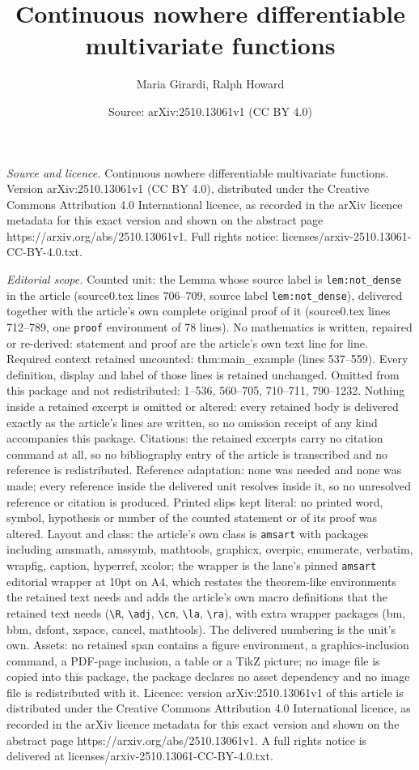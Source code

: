 \documentclass[10pt,a4paper]{amsart}
\title[Continuous nowhere differentiable multivariate functions]{Continuous nowhere differentiable multivariate functions}
\author{Maria Girardi, Ralph Howard}
\date{Source: arXiv:2510.13061v1 (CC BY 4.0)}
\begin{document}
\maketitle

\noindent\emph{Source and licence.} Continuous nowhere differentiable multivariate functions. Version arXiv:2510.13061v1 (CC BY 4.0), distributed under the Creative Commons Attribution 4.0 International licence, as recorded in the arXiv licence metadata for this exact version and shown on the abstract page https://arxiv.org/abs/2510.13061v1. Full rights notice: licenses/arxiv-2510.13061-CC-BY-4.0.txt.\par\smallskip

\noindent\textit{Editorial scope.} Counted unit: the Lemma whose source label is \texttt{lem:not\_dense} in the article (source0.tex lines 706--709, source label \texttt{lem:not\_dense}), delivered together with the article's own complete original proof of it (source0.tex lines 712--789, one \texttt{proof} environment of 78 lines). No mathematics is written, repaired or re-derived: statement and proof are the article's own text line for line. Required context retained uncounted: thm:main\_example (lines 537--559). Every definition, display and label of those lines is retained unchanged. Omitted from this package and not redistributed: 1--536, 560--705, 710--711, 790--1232. Nothing inside a retained excerpt is omitted or altered: every retained body is delivered exactly as the article's lines are written, so no omission receipt of any kind accompanies this package. Citations: the retained excerpts carry no citation command at all, so no bibliography entry of the article is transcribed and no reference is redistributed. Reference adaptation: none was needed and none was made; every reference inside the delivered unit resolves inside it, so no unresolved reference or citation is produced. Printed slips kept literal: no printed word, symbol, hypothesis or number of the counted statement or of its proof was altered. Layout and class: the article's own class is \texttt{amsart} with packages including amsmath, amssymb, mathtools, graphicx, overpic, enumerate, verbatim, wrapfig, caption, hyperref, xcolor; the wrapper is the lane's pinned \texttt{amsart} editorial wrapper at 10pt on A4, which restates the theorem-like environments the retained text needs and adds the article's own macro definitions that the retained text needs (\texttt{\textbackslash R}, \texttt{\textbackslash adj}, \texttt{\textbackslash cn}, \texttt{\textbackslash la}, \texttt{\textbackslash ra}), with extra wrapper packages (bm, bbm, dsfont, xspace, cancel, mathtools). The delivered numbering is the unit's own. Assets: no retained span contains a figure environment, a graphics-inclusion command, a PDF-page inclusion, a table or a TikZ picture; no image file is copied into this package, the package declares no asset dependency and no image file is redistributed with it. Licence: version arXiv:2510.13061v1 of this article is distributed under the Creative Commons Attribution 4.0 International licence, as recorded in the arXiv licence metadata for this exact version and shown on the abstract page https://arxiv.org/abs/2510.13061v1. A full rights notice is delivered at licenses/arxiv-2510.13061-CC-BY-4.0.txt. 
\end{document}

